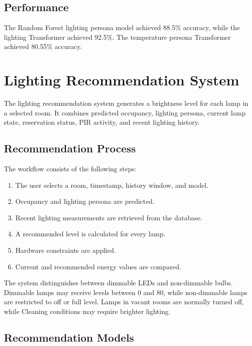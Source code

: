\section{Performance}

The Random Forest lighting persona model achieved 88.5\% accuracy, while the
lighting Transformer achieved 92.5\%. The temperature persona Transformer
achieved 80.55\% accuracy.


\chapter{Lighting Recommendation System}
\label{chap:lighting-recommendation}

The lighting recommendation system generates a brightness level for each lamp
in a selected room. It combines predicted occupancy, lighting persona, current
lamp state, reservation status, PIR activity, and recent lighting history.

\section{Recommendation Process}

The workflow consists of the following steps:

\begin{enumerate}
    \item The user selects a room, timestamp, history window, and model.
    \item Occupancy and lighting persona are predicted.
    \item Recent lighting measurements are retrieved from the database.
    \item A recommended level is calculated for every lamp.
    \item Hardware constraints are applied.
    \item Current and recommended energy values are compared.
\end{enumerate}

The system distinguishes between dimmable LEDs and non-dimmable bulbs.
Dimmable lamps may receive levels between 0 and 80, while non-dimmable lamps
are restricted to off or full level. Lamps in vacant rooms are normally turned
off, while Cleaning conditions may require brighter lighting.

\section{Recommendation Models}


